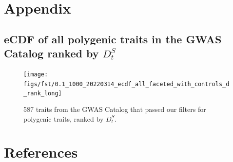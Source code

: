 \documentclass[
]{book}
\begin{document}
\hypertarget{appendix}{%
\chapter*{Appendix}\label{appendix}}

\hypertarget{ecdf-of-all-polygenic-traits-in-the-gwas-catalog-ranked-by-d_ts}{%
\section*{\texorpdfstring{eCDF of all polygenic traits in the GWAS Catalog ranked by \({D_t^S}\)}{eCDF of all polygenic traits in the GWAS Catalog ranked by \{D\_t\^{}S\}}}\label{ecdf-of-all-polygenic-traits-in-the-gwas-catalog-ranked-by-d_ts}}



\begin{figure}
\texttt{[image: figs/fst/0.1\_1000\_20220314\_ecdf\_all\_faceted\_with\_controls\_d\_rank\_long]} \caption{587 traits from the GWAS Catalog that passed our filters for polygenic traits, ranked by \({D_t^S}\).}\label{fig:eCDFall}
\end{figure}

\hypertarget{references}{%
\chapter*{References}\label{references}}
\end{document}

